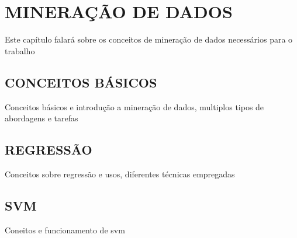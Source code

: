 
\chapter{MINERAÇÃO DE DADOS}
\label{chap:mineracao}
Este capítulo falará sobre os conceitos de mineração de dados necessários para o trabalho

\section{CONCEITOS BÁSICOS}
\label{sec:conceitosmineracao}
Conceitos básicos e introdução a mineração de dados, multiplos tipos de abordagens e tarefas

\section{REGRESSÃO}
\label{sec:regressao}
Conceitos sobre regressão e usos, diferentes técnicas empregadas

\section{SVM}
\label{sec:svm}
Coneitos e funcionamento de svm